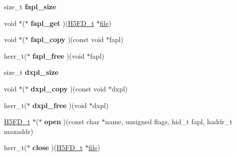 \begin{DoxyCompactItemize}
\mbox{\label{struct_h5_f_d__class__t_a601d81a583c71d12b3752ba412a53f84}} 
size\+\_\+t {\bfseries fapl\+\_\+size}
\item 
\mbox{\label{struct_h5_f_d__class__t_aefc4bfeb29c32bd837ac740b6dce28e0}} 
void $\ast$($\ast$ {\bfseries fapl\+\_\+get} )(\hyperlink{struct_h5_f_d__t}{H5\+F\+D\+\_\+t} $\ast$\hyperlink{structfile}{file})
\item 
\mbox{\label{struct_h5_f_d__class__t_a2c28d8a81c932590ac86df0bade95fd2}} 
void $\ast$($\ast$ {\bfseries fapl\+\_\+copy} )(const void $\ast$fapl)
\item 
\mbox{\label{struct_h5_f_d__class__t_a98f33157bcf81bcf2cca54293697e6c1}} 
herr\+\_\+t($\ast$ {\bfseries fapl\+\_\+free} )(void $\ast$fapl)
\item 
\mbox{\label{struct_h5_f_d__class__t_ab99ac19f6721b7d6e4a2560e746ed799}} 
size\+\_\+t {\bfseries dxpl\+\_\+size}
\item 
\mbox{\label{struct_h5_f_d__class__t_aebc8cb1720487c2de4ed9916fff16018}} 
void $\ast$($\ast$ {\bfseries dxpl\+\_\+copy} )(const void $\ast$dxpl)
\item 
\mbox{\label{struct_h5_f_d__class__t_adb1efac0fbac151cc4a6a5663cf9c94c}} 
herr\+\_\+t($\ast$ {\bfseries dxpl\+\_\+free} )(void $\ast$dxpl)
\item 
\mbox{\label{struct_h5_f_d__class__t_a758a0cb2af5afdfad420fbf0f8596a70}} 
\hyperlink{struct_h5_f_d__t}{H5\+F\+D\+\_\+t} $\ast$($\ast$ {\bfseries open} )(const char $\ast$name, unsigned flags, hid\+\_\+t fapl, haddr\+\_\+t maxaddr)
\item 
\mbox{\label{struct_h5_f_d__class__t_a63d6c5f4b7a75fbf6eea2bdf68b4f92e}} 
herr\+\_\+t($\ast$ {\bfseries close} )(\hyperlink{struct_h5_f_d__t}{H5\+F\+D\+\_\+t} $\ast$\hyperlink{structfile}{file})
\item 
\mbox{\label{struct_h5_f_d__class__t_a713e3373a1a518dc6c2e38ae51d70a86}} 

\end{DoxyCompactItemize}
